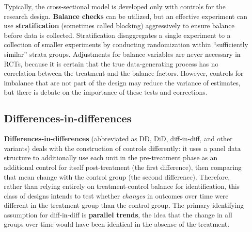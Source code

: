Typically, the cross-sectional model is developed
only with controls for the research design.
\textbf{Balance checks} can be utilized, but an effective experiment
can use \textbf{stratification} (sometimes called blocking) aggressively to ensure balance
before data is collected.\cite{athey2017econometrics}
Stratification disaggregates a single experiment to a collection
of smaller experiments by conducting randomization within
``sufficiently similar'' strata groups.
Adjustments for balance variables are never necessary in RCTs,
because it is certain that the true data-generating process
has no correlation between the treatment and the balance factors.
However, controls for imbalance that are not part of the design
may reduce the variance of estimates, but there is debate on
the importance of these tests and corrections.

\subsection{Differences-in-differences}

\textbf{Differences-in-differences}
(abbreviated as DD, DiD, diff-in-diff, and other variants)
deals with the construction of controls differently:
it uses a panel data structure to additionally use each
unit in the pre-treatment phase as an additional control for itself post-treatment (the first difference),
then comparing that mean change with the control group (the second difference).\cite{mckenzie2012beyond}
Therefore, rather than relying entirely on treatment-control balance for identification,
this class of designs intends to test whether \textit{changes}
in outcomes over time were different in the treatment group than the control group.
The primary identifying assumption for diff-in-diff is \textbf{parallel trends},
the idea that the change in all groups over time would have been identical
in the absense of the treatment.

